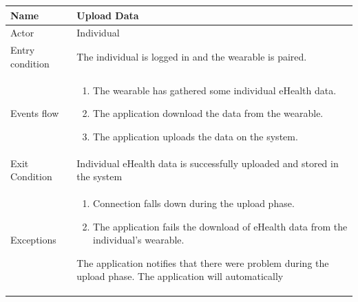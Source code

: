 \begin{tabular}{|l|p{11cm}|}
    \hline
    Name & Upload Data
    \\ \hline
    Actor & Individual
    \\ \hline 
    Entry condition & The individual is logged in and the wearable is paired.
    \\ \hline
    Events flow &
    \begin{enumerate}
    \item The wearable has gathered some individual eHealth data.
    \item The application download the data from the wearable.
    \item The application uploads the data on the system.
    \end{enumerate}
     \\ \hline
     Exit Condition & Individual eHealth data is successfully uploaded and stored in the system
     \\
    \hline
    Exceptions &
        \begin{enumerate}
    \item Connection falls down during the upload phase.
    \item The application fails the download of eHealth data from the individual's wearable.
   
    \end{enumerate}
  The application notifies that there were problem during the upload phase. The application will automatically 
      \\
    \hline
\end{tabular}



